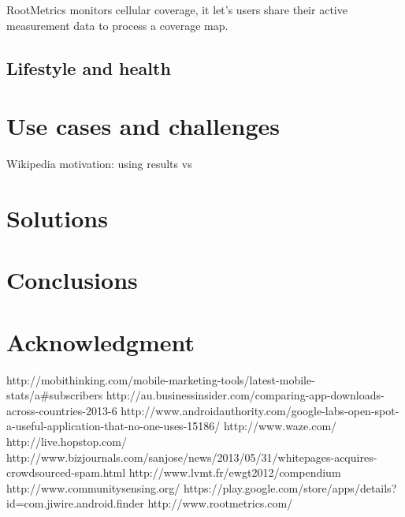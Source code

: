 \documentclass[conference,letterpaper]{IEEEtran}
\begin{document}
RootMetrics monitors cellular coverage, it let's users share their active measurement data to process a coverage map.

\subsection{Lifestyle and health}





\section{Use cases and challenges}
\label{sec:use_cases}

Wikipedia motivation: using results vs 
\section{Solutions}
\label{sec:solutions}
\section{Conclusions}
\label{sec:conclusion_and_future_work}
\section{Acknowledgment}
\label{sec:acknowledgment}
http://mobithinking.com/mobile-marketing-tools/latest-mobile-stats/a\#subscribers
http://au.businessinsider.com/comparing-app-downloads-across-countries-2013-6
http://www.androidauthority.com/google-labs-open-spot-a-useful-application-that-no-one-uses-15186/
http://www.waze.com/
http://live.hopstop.com/
http://www.bizjournals.com/sanjose/news/2013/05/31/whitepages-acquires-crowdsourced-spam.html
http://www.lvmt.fr/ewgt2012/compendium
http://www.communitysensing.org/
https://play.google.com/store/apps/details?id=com.jiwire.android.finder
http://www.rootmetrics.com/
\end{document}
